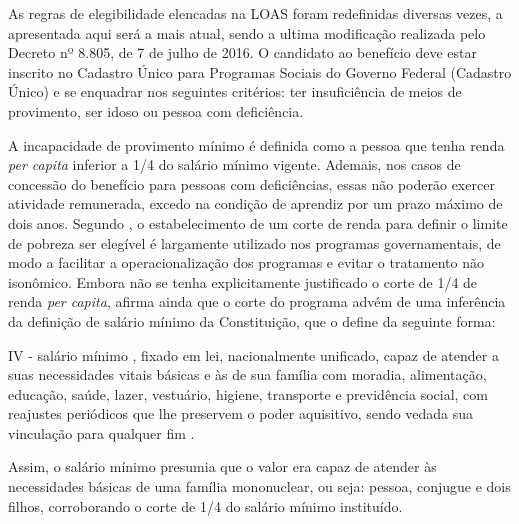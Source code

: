 \documentclass[
	12pt,				%
	openright,			%
	twoside,			%
	a4paper,			%
	english,			%
	french,				%
	spanish,			%
	brazil				%
	]{abntex2}
\begin{document}
As regras de elegibilidade elencadas na LOAS foram redefinidas diversas vezes, a apresentada aqui será a mais atual, sendo a ultima modificação realizada pelo Decreto nº 8.805, de 7 de julho de 2016. O candidato ao benefício deve estar inscrito no Cadastro Único para Programas Sociais do Governo Federal (Cadastro Único) e se enquadrar nos seguintes critérios: ter insuficiência de meios de provimento, ser idoso ou pessoa com deficiência.
		
		 A incapacidade de provimento mínimo é definida como a pessoa que tenha renda \textit{per capita} inferior a 1/4 do salário mínimo vigente. Ademais, nos casos de concessão do benefício para pessoas com deficiências, essas não poderão exercer atividade remunerada, excedo na condição de aprendiz por um prazo máximo de dois anos. Segundo , o estabelecimento de um corte de renda para definir o limite de pobreza ser elegível é largamente utilizado nos programas governamentais, de modo a facilitar a operacionalização dos programas e evitar o tratamento não isonômico. Embora não se tenha explicitamente justificado o corte de 1/4 de renda \textit{per capita},  afirma ainda que o corte do programa advém de uma inferência da definição de salário mínimo da Constituição, que o define da seguinte forma:
		 
		 \begin{citacao}
		 	IV - salário mínimo , fixado em lei, nacionalmente unificado, capaz de atender a suas necessidades vitais básicas e às de sua família com moradia, alimentação, educação, saúde, lazer, vestuário, higiene, transporte e previdência social, com reajustes periódicos que lhe preservem o poder aquisitivo, sendo vedada sua vinculação para qualquer fim \cite[Art. 7{\textordmasculine}]{brasil1988}.
		 	
		 \end{citacao}
	 
	  Assim, o salário mínimo presumia que o valor era capaz de atender às necessidades básicas de uma família mononuclear, ou seja: pessoa, conjugue e dois filhos, corroborando o corte de 1/4 do salário mínimo instituído.
		
\end{document}
